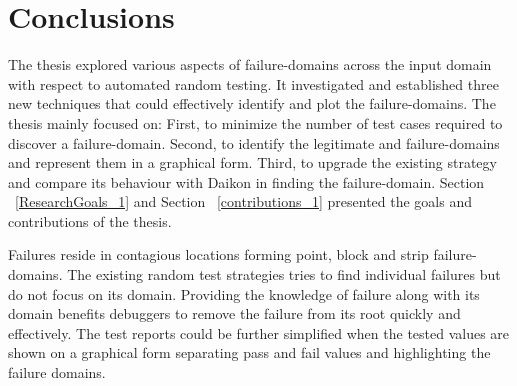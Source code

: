 
\chapter{Conclusions}
\label{chap:conclusions}



The thesis explored various aspects of failure-domains across the input domain with respect to automated random testing. It investigated and established three new techniques that could effectively identify and plot the failure-domains. The thesis mainly focused on: First, to minimize the number of test cases required to discover a failure-domain.
Second, to identify the legitimate and failure-domains and represent them in a graphical form. Third, to upgrade the existing strategy and compare its behaviour with Daikon in finding the failure-domain.
 Section ~\ref{ResearchGoals_1} and Section ~\ref{contributions_1} presented the goals and contributions of the thesis.


Failures reside in contagious locations forming point, block and strip failure-domains. The existing random test strategies tries to find individual failures but do not focus on its domain. Providing the knowledge of failure along with its domain benefits debuggers to remove the failure from its root quickly and effectively. The test reports could be further simplified when the tested values are shown on a graphical form separating pass and fail values and highlighting the failure domains.


